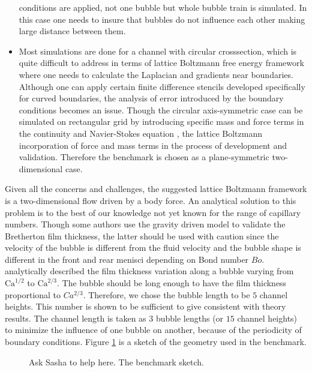 \documentclass{article}
\newcommand{\Ca}{\mathrm{Ca}}
\begin{document}
\begin{itemize}
conditions are applied, not one bubble but whole bubble train is simulated. In this case one needs
to insure that bubbles do not influence each other making large distance between them.
 \item Most simulations are done for a channel with circular crosssection,
which is quite difficult to address in terms of lattice Boltzmann free energy
framework where one needs to calculate the Laplacian and gradients near boundaries.
Although one can apply certain finite difference stencils
\cite{arnold-boundary,hunt-boundary} developed specifically for curved boundaries,
the analysis of error introduced by the boundary conditions becomes an issue. Though the circular
axis-symmetric case can be simulated on rectangular grid by introducing specific mass and force
terms in the continuity and Navier-Stokes equation \cite{halliday-circular}, the lattice Boltzmann
incorporation of force and mass terms in the process of development and validation. Therefore
the benchmark is chosen as a plane-symmetric two-dimensional case.  

\end{itemize}
Given all the concerns and challenges, the suggested lattice Boltzmann framework
is a two-dimensional flow driven by a body force.  An analytical
solution to this problem is to the best of our knowledge not yet known for the range of capillary
numbers.
Though some authors \cite{sehgal-microchannel} use the gravity driven model to
validate the Bretherton film thickness, the latter should be used with caution
since the velocity of the bubble is different from the fluid velocity and the
bubble shape
is different in the front and rear menisci depending on Bond number $Bo$. \citet{wong-films}
analytically described the film thickness variation along a bubble varying from $\Ca^{1/2}$ to
$\Ca^{2/3}$. The bubble should be long enough to have the film thickness proportional to
$Ca^{2/3}$. Therefore, we chose the bubble length to be $5$ channel heights. This number is shown
to be sufficient to give consistent with theory results. The
channel length is taken  as $3$ bubble lengths (or $15$ channel heights)
to minimize the influence of one bubble on another,
because of the periodicity of boundary conditions.
Figure \ref{fig:benchmark:sketch} is a sketch of the geometry
used in the benchmark.
\begin{figure}
\caption{{\color{red} Ask Sasha to help here. The benchmark sketch.}
\label{fig:benchmark:sketch}}
\end{figure}
\end{document}
